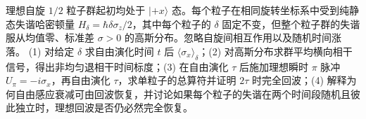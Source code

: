 理想自旋 \(1/2\) 粒子群起初均处于 \(|+x\rangle\) 态。每个粒子在相同旋转坐标系中受到纯静态失谐哈密顿量 \(H_\delta=\hbar\delta\sigma_z/2\)，其中每个粒子的 \(\delta\) 固定不变，但整个粒子群的失谐服从均值零、标准差 \(\sigma>0\) 的高斯分布。忽略自旋间相互作用以及随机时间涨落。
(1) 对给定 \(\delta\) 求自由演化时间 \(t\) 后 \(\langle\sigma_x\rangle_\delta\)；(2) 对高斯分布求群平均横向相干信号，得出非均匀退相干时间标度；(3) 在自由演化 \(\tau\) 后施加理想瞬时 \(\pi\) 脉冲 \(U_\pi=-i\sigma_x\)，再自由演化 \(\tau\)，求单粒子的总算符并证明 \(2\tau\) 时完全回波；(4) 解释为何自由感应衰减可由回波恢复，并讨论如果每个粒子的失谐在两个时间段随机且彼此独立时，理想回波是否仍必然完全恢复。
